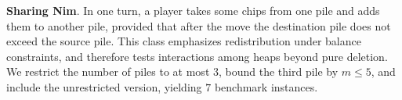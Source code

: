 \documentclass[review]{elsarticle}
\newcommand{\set}[1]{\{ #1 \}}
\newcommand{\tuple}[1]{\langle {#1} \rangle}
\newcommand{\true}{\top}
\newcommand{\statevar}{\mathcal{X}}
\newcommand{\act}{\mathcal{A}}
\newcommand{\constraint}{\mathcal{C}}
\newcommand{\estate}{\mathcal{E}}
\newcommand{\pre}{\mathtt{pre}}
\newcommand{\eff}{\mathtt{eff}}
\begin{document}
{\color{red}\textbf{Sharing Nim}. In one turn, a player takes some chips from one pile and adds them to another pile, provided that after the move the destination pile does not exceed the source pile.}
{\color{red}This class emphasizes redistribution under balance constraints, and therefore tests interactions among heaps beyond pure deletion.}
{\color{red}We restrict the number of piles to at most $3$, bound the third pile by $m \le 5$, and include the unrestricted version, yielding $7$ benchmark instances.}
\end{document}
